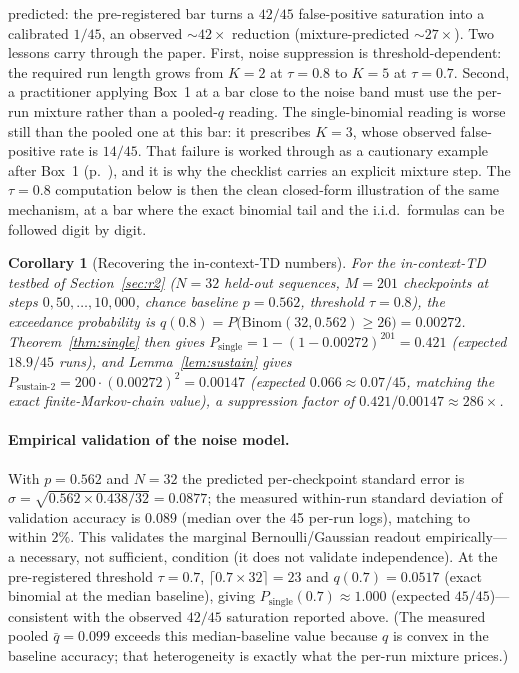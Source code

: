 \documentclass[11pt]{article}
\theoremstyle{plain}
\newtheorem{corollary}{Corollary}
\theoremstyle{definition}
\begin{document}
predicted: the pre-registered bar turns a $42/45$ false-positive saturation into a
calibrated $1/45$, an observed ${\sim}42\times$ reduction (mixture-predicted
${\sim}27\times$). Two lessons carry through the paper. First, noise suppression is
threshold-dependent: the required run length grows from $K=2$ at $\tau=0.8$ to $K=5$ at
$\tau=0.7$. Second, a practitioner applying Box~1 at a bar close to the noise band must
use the per-run mixture rather than a pooled-$q$ reading. The single-binomial reading is
worse still than the pooled one at this bar: it prescribes $K=3$, whose observed
false-positive rate is $14/45$. That failure is worked through as a cautionary example
after Box~1 (p.~\pageref{par:box1caution}), and it is why the checklist carries an
explicit mixture step. The $\tau=0.8$ computation
below is then the clean closed-form illustration of the same mechanism, at a bar where
the exact binomial tail and the i.i.d.\ formulas can be followed digit by digit.

\begin{corollary}[Recovering the in-context-TD numbers]\label{cor:numbers}
For the in-context-TD testbed of Section~\ref{sec:r2} ($N=32$ held-out sequences, $M=201$
checkpoints at steps $0,50,\dots,10{,}000$, chance baseline $p=0.562$, threshold
$\tau=0.8$), the exceedance probability is
$q(0.8)=P\!\bigl(\mathrm{Binom}(32,0.562)\geq 26\bigr)=0.00272$. Theorem~\ref{thm:single}
then gives $P_{\mathrm{single}}=1-(1-0.00272)^{201}=0.421$ (expected $18.9/45$ runs), and
Lemma~\ref{lem:sustain} gives $P_{\mathrm{sustain}\text{-}2}=200\cdot(0.00272)^{2}=0.00147$
(expected $0.066\approx0.07/45$, matching the exact finite-Markov-chain value), a
suppression factor of $0.421/0.00147\approx 286\times$.
\end{corollary}

\paragraph{Empirical validation of the noise model.}
With $p=0.562$ and $N=32$ the predicted per-checkpoint standard error is
$\sigma=\sqrt{0.562\times0.438/32}=0.0877$; the measured within-run standard deviation of
validation accuracy is $0.089$ (median over the 45 per-run logs), matching to within $2\%$.
This validates the marginal Bernoulli/Gaussian readout empirically---a necessary, not
sufficient, condition (it does not validate independence). At the pre-registered threshold
$\tau=0.7$, $\lceil0.7\times32\rceil=23$ and $q(0.7)=0.0517$ (exact binomial at the median
baseline), giving $P_{\mathrm{single}}(0.7)\approx1.000$ (expected $45/45$)---consistent
with the observed $42/45$ saturation reported above. (The measured pooled
$\bar q=0.099$ exceeds this median-baseline value because $q$ is convex in the baseline
accuracy; that heterogeneity is exactly what the per-run mixture prices.)
\end{document}
